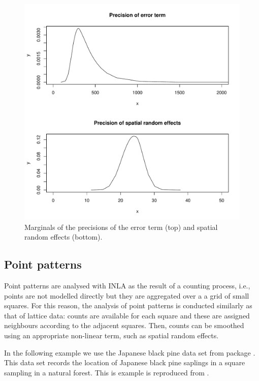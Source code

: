 \documentclass[article]{jss}
\begin{document}
\begin{figure}[h]
\begin{center}
\includegraphics{spatial_inla-004}
\end{center}
\caption{Marginals of the precisions of the error term (top) and
spatial random effects (bottom).}
\label{fig:marg1}
\end{figure}


\subsection{Point patterns}

Point patterns are analysed with INLA as the result of a counting process,
i.e., points are not modelled directly but they are aggregated over a a grid
of small squares. For this reason, the analysis of point patterns is conducted
similarly as that of lattice data: counts are available for each square and 
these are assigned neighbours according to the adjacent squares. Then, counts
can be smoothed using an appropriate non-linear term, such as spatial
random effects.

In the following example we use the Japanese black pine data set from
 package . This data set records the location of
Japanese black pine saplings in a square sampling in a natural forest.  This
is example is reproduced from \citet{GomezRubioetal:2013}.
\end{document}
